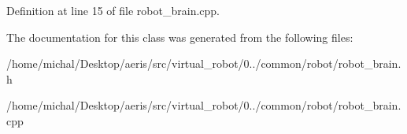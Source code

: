 Definition at line 15 of file robot\-\_\-brain.\-cpp.



The documentation for this class was generated from the following files\-:\begin{DoxyCompactItemize}
\item 
/home/michal/\-Desktop/aeris/src/virtual\-\_\-robot/0../common/robot/robot\-\_\-brain.\-h\item 
/home/michal/\-Desktop/aeris/src/virtual\-\_\-robot/0../common/robot/robot\-\_\-brain.\-cpp\end{DoxyCompactItemize}

